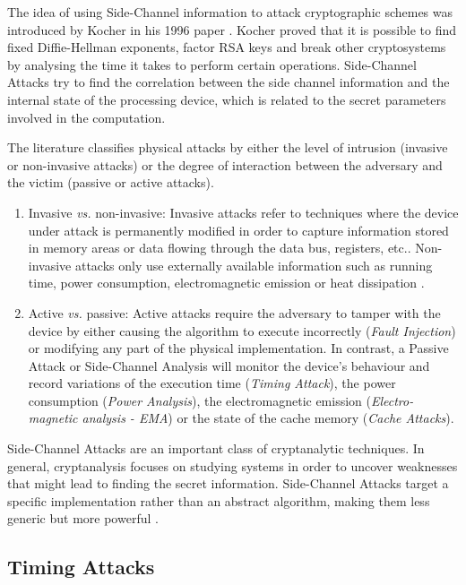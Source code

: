 \documentclass[10pt,a4paper,twoside]{book}
\begin{document}
The idea of using Side-Channel information to attack cryptographic schemes was introduced by Kocher in his 1996 paper \cite{kocher1996timing}. Kocher proved that it is possible to find fixed Diffie-Hellman exponents, factor RSA keys and break other cryptosystems by analysing the time it takes to perform certain operations. Side-Channel Attacks try to find the correlation between the side channel information and the internal state of the processing device, which is related to the secret parameters involved in the computation. 

The literature classifies physical attacks by either the level of intrusion (invasive or non-invasive attacks) or the degree of interaction between the adversary and the victim (passive or active attacks).
\begin{enumerate}
\item Invasive \textit{vs.} non-invasive: Invasive attacks refer to techniques where the device under attack is permanently modified in order to capture information stored in memory areas or data flowing through the data bus, registers, etc.\cite{Tria2011}. Non-invasive attacks only use externally available information such as running time, power consumption, electromagnetic emission or heat dissipation \cite{standaert2010introduction}.
\item Active \textit{vs.} passive: Active attacks require the adversary to tamper with the device by either causing the algorithm to execute incorrectly (\textit{Fault Injection}) or modifying any part of the physical implementation. In contrast, a Passive Attack or Side-Channel Analysis will monitor the device's behaviour and record variations of the execution time (\textit{Timing Attack}), the power consumption (\textit{Power Analysis}), the electromagnetic emission (\textit{Electro-magnetic analysis - EMA}) or the state of the cache memory (\textit{Cache Attacks}).
\end{enumerate}

Side-Channel Attacks are an important class of cryptanalytic techniques. In general, cryptanalysis focuses on studying systems in order to uncover weaknesses that might lead to finding the secret information. Side-Channel Attacks target a specific implementation rather than an abstract algorithm, making them less generic but more powerful \cite{standaert2010introduction}.

\subsection{Timing Attacks}
\end{document}

